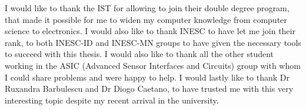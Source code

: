 
\begin{acknowledgments}

  I would like to thank the \ac{IST} for allowing to join their double degree program, that made it possible for me to widen my computer knowledge from computer science to electronics.
  I would also like to thank \ac{INESC} to have let me join their rank, to both \ac{INESC}-ID and \ac{INESC}-MN groups to have given the necessary tools to succeed with this thesis.
  I would also like to thank all the other student working in the ASIC (Advanced Sensor Interfaces and Circuits) group with whom I could share problems and were happy to help.
  I would lastly like to thank Dr Ruxandra Barbulescu and Dr Diogo Caetano, to have trusted me with this very interesting topic despite my recent arrival in the university.

\end{acknowledgments}
\clearpage
\thispagestyle{empty}
\cleardoublepage
